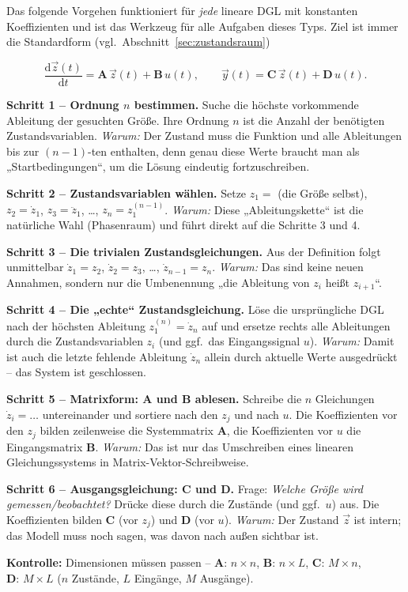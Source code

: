 Das folgende Vorgehen funktioniert für \emph{jede} lineare DGL mit konstanten
Koeffizienten und ist das Werkzeug für alle Aufgaben dieses Typs. Ziel ist immer
die Standardform (vgl.\ Abschnitt~\ref{sec:zustandsraum})

$$
\frac{\mathrm{d}\vec{z}(t)}{\mathrm{d}t} = \mathbf{A}\,\vec{z}(t) + \mathbf{B}\,u(t),
\qquad
\vec{y}(t) = \mathbf{C}\,\vec{z}(t) + \mathbf{D}\,u(t).
$$

\begin{bemerkung}

\textbf{Schritt 1 – Ordnung $n$ bestimmen.}
Suche die höchste vorkommende Ableitung der gesuchten Größe. Ihre Ordnung $n$
ist die Anzahl der benötigten Zustandsvariablen. \emph{Warum:} Der Zustand muss
die Funktion und alle Ableitungen bis zur $(n-1)$-ten enthalten, denn genau
diese Werte braucht man als „Startbedingungen``, um die Lösung eindeutig
fortzuschreiben.

\textbf{Schritt 2 – Zustandsvariablen wählen.}
Setze $z_1 = $ (die Größe selbst), $z_2 = \dot{z}_1$, $z_3 = \ddot{z}_1$, \ldots,
$z_n = z_1^{(n-1)}$. \emph{Warum:} Diese „Ableitungskette`` ist die natürliche
Wahl (Phasenraum) und führt direkt auf die Schritte 3 und 4.

\textbf{Schritt 3 – Die trivialen Zustandsgleichungen.}
Aus der Definition folgt unmittelbar $\dot{z}_1 = z_2$, $\dot{z}_2 = z_3$,
\ldots, $\dot{z}_{n-1} = z_n$. \emph{Warum:} Das sind keine neuen Annahmen,
sondern nur die Umbenennung „die Ableitung von $z_i$ heißt $z_{i+1}$``.

\textbf{Schritt 4 – Die „echte`` Zustandsgleichung.}
Löse die ursprüngliche DGL nach der höchsten Ableitung $z_1^{(n)} = \dot{z}_n$
auf und ersetze rechts alle Ableitungen durch die Zustandsvariablen $z_i$ (und
ggf.\ das Eingangssignal $u$). \emph{Warum:} Damit ist auch die letzte fehlende
Ableitung $\dot{z}_n$ allein durch aktuelle Werte ausgedrückt -- das System ist
geschlossen.

\textbf{Schritt 5 – Matrixform: $\mathbf{A}$ und $\mathbf{B}$ ablesen.}
Schreibe die $n$ Gleichungen $\dot{z}_i = \ldots$ untereinander und sortiere
nach den $z_j$ und nach $u$. Die Koeffizienten vor den $z_j$ bilden zeilenweise
die Systemmatrix $\mathbf{A}$, die Koeffizienten vor $u$ die Eingangsmatrix
$\mathbf{B}$. \emph{Warum:} Das ist nur das Umschreiben eines linearen
Gleichungssystems in Matrix-Vektor-Schreibweise.

\textbf{Schritt 6 – Ausgangsgleichung: $\mathbf{C}$ und $\mathbf{D}$.}
Frage: \emph{Welche Größe wird gemessen/beobachtet?} Drücke diese durch die
Zustände (und ggf.\ $u$) aus. Die Koeffizienten bilden $\mathbf{C}$ (vor $z_j$)
und $\mathbf{D}$ (vor $u$). \emph{Warum:} Der Zustand $\vec{z}$ ist intern; das
Modell muss noch sagen, was davon nach außen sichtbar ist.

\textbf{Kontrolle:} Dimensionen müssen passen --
$\mathbf{A}\!:\,n\times n$, $\mathbf{B}\!:\,n\times L$,
$\mathbf{C}\!:\,M\times n$, $\mathbf{D}\!:\,M\times L$
($n$ Zustände, $L$ Eingänge, $M$ Ausgänge).

\end{bemerkung}

